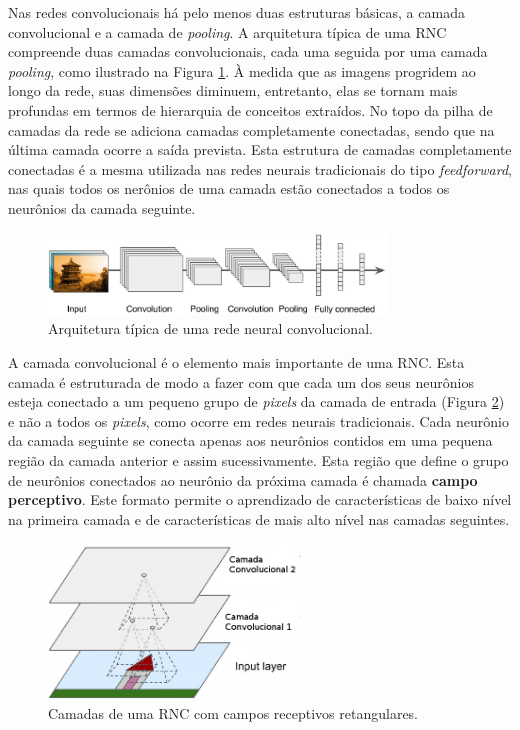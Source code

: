 Nas redes convolucionais há pelo menos duas estruturas básicas, a camada convolucional e a camada de \textit{pooling}.
A arquitetura típica de uma RNC compreende duas camadas convolucionais, cada uma seguida por
uma camada \textit{pooling}, como ilustrado na Figura \ref{fig:cnn_basic_arq}. À medida que as imagens progridem
ao longo da rede, suas dimensões diminuem, entretanto, elas se tornam mais profundas
em termos de hierarquia de conceitos extraídos. No topo da pilha de camadas da rede
se adiciona camadas completamente conectadas, sendo que na última camada ocorre a saída prevista.
Esta estrutura de camadas completamente conectadas é a mesma utilizada nas redes neurais tradicionais
do tipo \textit{feedforward}, nas quais todos os nerônios de uma camada estão conectados a todos os
neurônios da camada seguinte. 
\begin{figure}[htp]
\begin{center}
  \includegraphics[width=0.8\textwidth]{fig/cnn_basic_arq}
  \caption{Arquitetura típica de uma rede neural convolucional. \citep{aurelien17}}
  \label{fig:cnn_basic_arq}
\end{center}
\end{figure}

A camada convolucional é o elemento mais importante de uma RNC. Esta camada é estruturada
de modo a fazer com que cada um dos seus neurônios esteja conectado a um 
pequeno grupo de \textit{pixels} da camada de entrada (Figura \ref{fig:cnn_arq}) e não a todos os \textit{pixels}, como
ocorre em redes neurais tradicionais. Cada neurônio da camada seguinte se conecta apenas aos neurônios
contidos em uma pequena região da camada anterior e assim sucessivamente. Esta região que define
o grupo de neurônios conectados ao neurônio da próxima camada é chamada \textbf{campo perceptivo}.
Este formato permite o aprendizado de características de baixo nível na primeira camada e de
características de mais alto nível nas camadas seguintes.
\begin{figure}[htp]
\begin{center}
  \includegraphics[width=0.6\textwidth]{fig/cnn_arq}
  \caption{Camadas de uma RNC com campos receptivos retangulares. \citep{aurelien17}}
  \label{fig:cnn_arq}
\end{center}
\end{figure}

